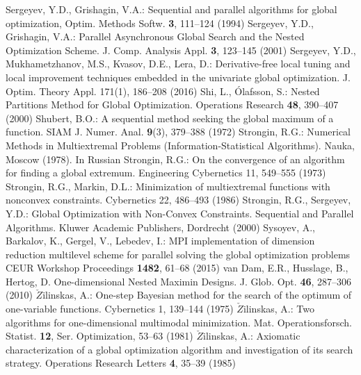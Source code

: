 \begin{thebibliography}{99.}
 Sergeyev, Y.D., Grishagin, V.A.: Sequential and parallel algorithms for global optimization, Optim. Methods Softw. \textbf{3},  111--124 (1994)
	Sergeyev, Y.D., Grishagin, V.A.: Parallel Asynchronous Global Search and the Nested Optimization Scheme. J. Comp. Analysis Appl. \textbf{3}, 123--145 (2001)
 Sergeyev, Y.D., Mukhametzhanov, M.S., Kvasov, D.E., Lera, D.: Derivative-free local tuning and local improvement techniques embedded in the univariate global optimization. J. Optim. Theory Appl. 171(1), 186--208 (2016)
   Shi, L., {\'O}lafsson, S.: Nested Partitions Method for Global Optimization. Operations Research \textbf{48}, 390--407 (2000)
 Shubert, B.O.: A sequential method seeking the global maximum of a function. SIAM J. Numer. Anal. \textbf{9}(3), 379–388 (1972)
	Strongin, R.G.: Numerical Methods in Multiextremal Problems (Information-Statistical Algorithms). Nauka, Moscow (1978). In Russian
 Strongin, R.G.: On the convergence of an algorithm for finding a global extremum. Engineering Cybernetics 11, 549–555 (1973)
 Strongin, R.G., Markin, D.L.: Minimization of multiextremal functions with nonconvex constraints. Cybernetics 22, 486–493 (1986)
 Strongin, R.G., Sergeyev, Y.D.: Global Optimization with Non-Convex Constraints. Sequential and Parallel Algorithms. Kluwer Academic Publishers, Dordrecht (2000) 
 Sysoyev, A., Barkalov, K., Gergel, V., Lebedev, I.: MPI implementation of dimension reduction multilevel scheme for parallel solving the global optimization problems  CEUR Workshop Proceedings \textbf{1482}, 61--68 (2015)
	van Dam, E.R., Husslage, B., Hertog, D. One-dimensional Nested Maximin Designs. J. Glob. Opt. \textbf{46}, 287--306 (2010)
 $\check{Z}$ilinskas, A.: One-step Bayesian method for the search of the optimum of one-variable functions. Cybernetics 1, 139--144 (1975)
 $\check{Z}$ilinskas, A.: Two algorithms for one-dimensional multimodal minimization. Mat. Operationsforsch. Statist. \textbf{12}, Ser. Optimization, 53--63 (1981)
 $\check{Z}$ilinskas, A.: Axiomatic characterization of a global optimization algorithm and investigation of its search strategy. Operations Research Letters \textbf{4}, 35--39 (1985)
\end{thebibliography}

%
